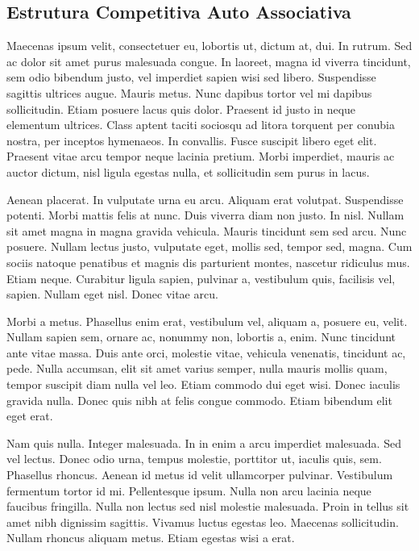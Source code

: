 \subsection{Estrutura Competitiva Auto Associativa}

Maecenas ipsum velit, consectetuer eu, lobortis ut, dictum at, dui. In rutrum. Sed ac dolor sit amet purus malesuada congue. In laoreet, magna id viverra tincidunt, sem odio bibendum justo, vel imperdiet sapien wisi sed libero. Suspendisse sagittis ultrices augue. Mauris metus. Nunc dapibus tortor vel mi dapibus sollicitudin. Etiam posuere lacus quis dolor. Praesent id justo in neque elementum ultrices. Class aptent taciti sociosqu ad litora torquent per conubia nostra, per inceptos hymenaeos. In convallis. Fusce suscipit libero eget elit. Praesent vitae arcu tempor neque lacinia pretium. Morbi imperdiet, mauris ac auctor dictum, nisl ligula egestas nulla, et sollicitudin sem purus in lacus.



Aenean placerat. In vulputate urna eu arcu. Aliquam erat volutpat. Suspendisse potenti. Morbi mattis felis at nunc. Duis viverra diam non justo. In nisl. Nullam sit amet magna in magna gravida vehicula. Mauris tincidunt sem sed arcu. Nunc posuere. Nullam lectus justo, vulputate eget, mollis sed, tempor sed, magna. Cum sociis natoque penatibus et magnis dis parturient montes, nascetur ridiculus mus. Etiam neque. Curabitur ligula sapien, pulvinar a, vestibulum quis, facilisis vel, sapien. Nullam eget nisl. Donec vitae arcu.

Morbi a metus. Phasellus enim erat, vestibulum vel, aliquam a, posuere eu, velit. Nullam sapien sem, ornare ac, nonummy non, lobortis a, enim. Nunc tincidunt ante vitae massa. Duis ante orci, molestie vitae, vehicula venenatis, tincidunt ac, pede. Nulla accumsan, elit sit amet varius semper, nulla mauris mollis quam, tempor suscipit diam nulla vel leo. Etiam commodo dui eget wisi. Donec iaculis gravida nulla. Donec quis nibh at felis congue commodo. Etiam bibendum elit eget erat.

Nam quis nulla. Integer malesuada. In in enim a arcu imperdiet malesuada. Sed vel lectus. Donec odio urna, tempus molestie, porttitor ut, iaculis quis, sem. Phasellus rhoncus. Aenean id metus id velit ullamcorper pulvinar. Vestibulum fermentum tortor id mi. Pellentesque ipsum. Nulla non arcu lacinia neque faucibus fringilla. Nulla non lectus sed nisl molestie malesuada. Proin in tellus sit amet nibh dignissim sagittis. Vivamus luctus egestas leo. Maecenas sollicitudin. Nullam rhoncus aliquam metus. Etiam egestas wisi a erat.

